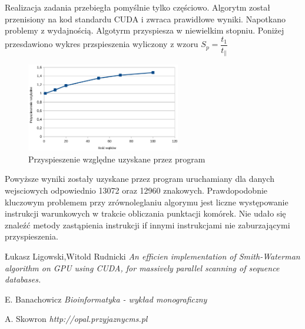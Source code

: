 \documentclass[a4paper,12pt]{article}
\begin{document}
Realizacja zadania przebiegła pomyślnie tylko częściowo. Algorytm został przenisiony na kod standardu CUDA i zwraca prawidłowe wyniki. Napotkano problemy z wydajnością. Algotyrm przyspiesza w niewielkim stopniu. Poniżej przesdawiono wykres przspieszenia wyliczony z wzoru $S_{p} = \dfrac{t_{1}}{t_{\parallel}}$

\begin{figure}[H]
  \vspace{5pt}
  \centering
  \begin{center}
  \includegraphics[width=0.6\textwidth]{images/wykres.png}
  \end{center}
  \caption{Przyspieszenie względne uzyskane przez program}
 \end{figure}
 
 
 Powyższe wyniki zostały uzyskane przez program uruchamiany dla danych wejsciowych odpowiednio 13072 oraz 12960 znakowych. Prawdopodobnie kluczowym problemem przy zrównoleglaniu algorymu jest liczne występowanie instrukcji warunkowych w trakcie obliczania punktacji komórek. Nie udało się znaleźć metody zastąpienia instrukcji if innymi instrukcjami nie zaburzającymi przyspieszenia.


\begin{thebibliography}{9}

  Łukasz Ligowski,Witold Rudnicki
  \emph{An efficien implementation of Smith-Waterman algorithm on GPU using CUDA, for massively parallel scanning of sequence databases.}
  
  E. Banachowicz
  \emph{Bioinformatyka - wykład monograficzny}
  
  A. Skowron
  \emph{http://opal.przyjaznycms.pl}


\end{thebibliography}
\end{document}
